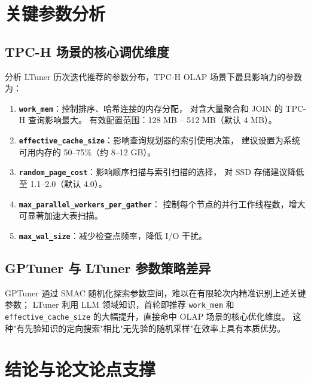 
\section{关键参数分析}

\subsection{TPC-H 场景的核心调优维度}

分析 LTuner 历次迭代推荐的参数分布，TPC-H OLAP 场景下最具影响力的参数为：

\begin{enumerate}
  \item \textbf{\texttt{work\_mem}}：控制排序、哈希连接的内存分配，
        对含大量聚合和 JOIN 的 TPC-H 查询影响最大。
        有效配置范围：128 MB -- 512 MB（默认 4 MB）。
  \item \textbf{\texttt{effective\_cache\_size}}：影响查询规划器的索引使用决策，
        建议设置为系统可用内存的 50--75\%（约 8--12 GB）。
  \item \textbf{\texttt{random\_page\_cost}}：影响顺序扫描与索引扫描的选择，
        对 SSD 存储建议降低至 1.1--2.0（默认 4.0）。
  \item \textbf{\texttt{max\_parallel\_workers\_per\_gather}}：
        控制每个节点的并行工作线程数，增大可显著加速大表扫描。
  \item \textbf{\texttt{max\_wal\_size}}：减少检查点频率，降低 I/O 干扰。
\end{enumerate}

\subsection{GPTuner 与 LTuner 参数策略差异}

GPTuner 通过 SMAC 随机化探索参数空间，难以在有限轮次内精准识别上述关键参数；
LTuner 利用 LLM 领域知识，首轮即推荐 \texttt{work\_mem} 和
\texttt{effective\_cache\_size} 的大幅提升，直接命中 OLAP 场景的核心优化维度。
这种"有先验知识的定向搜索"相比"无先验的随机采样"在效率上具有本质优势。



\section{结论与论文论点支撑}

